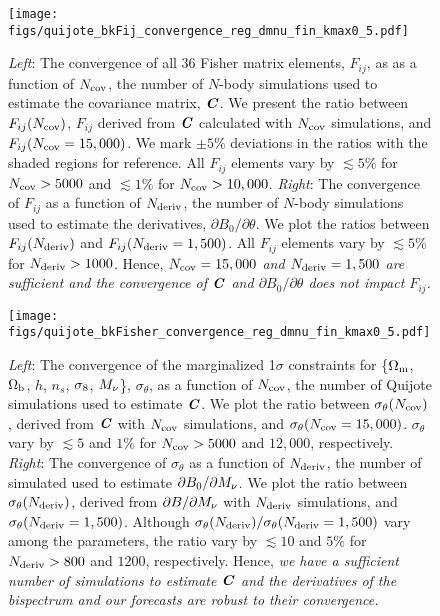 \begin{figure}
\begin{center}
    \texttt{[image: figs/quijote\_bkFij\_convergence\_reg\_dmnu\_fin\_kmax0\_5.pdf]}
    \caption{
        {\em Left}: The convergence of all 36 Fisher matrix elements, $F_{ij}$, as 
        as a function of $N_{\rm cov}$, the number of $N$-body simulations used to 
        estimate the covariance matrix, $\textbf{\textit{C}}$. We present the ratio between 
        $F_{ij}(N_{\rm cov})$, $F_{ij}$ derived from $\textbf{\textit{C}}$ calculated with 
        $N_{\rm cov}$ simulations, and $F_{ij}(N_{\rm cov} = 15,000)$. We mark 
        $\pm5\%$ deviations in the ratios with the shaded regions for reference. 
        All $F_{ij}$ elements vary by $\lesssim 5\%$ for $N_{\rm cov} > 5000$ and 
        $\lesssim 1\%$ for $N_{\rm cov} > 10,000$.
        {\em Right}: The convergence of $F_{ij}$ as a function of $N_{\rm deriv}$, 
        the number of $N$-body simulations used to estimate the derivatives, 
        $\partial B_0/\partial \theta$. We plot the ratios between $F_{ij}(N_{\rm deriv})$ 
        and $F_{ij}(N_{\rm deriv} = 1,500)$. All $F_{ij}$ elements vary by 
        $\lesssim 5\%$ for $N_{\rm deriv} > 1000$. Hence, {\em $N_{\rm cov} = 15,000$ 
        and $N_{\rm deriv} = 1,500$ are sufficient and the convergence of $\textbf{\textit{C}}$ 
        and $\partial B_0/\partial \theta$ does not impact $F_{ij}$.}
    }
\label{fig:fij_converge}
\end{center}
\end{figure}

\begin{figure}
\begin{center}
    \texttt{[image: figs/quijote\_bkFisher\_convergence\_reg\_dmnu\_fin\_kmax0\_5.pdf]} 
    \caption{{\em Left}: The convergence of the marginalized 1$\sigma$ constraints
    for \{$\Omega_{\rm m}$, $\Omega_{\rm b}$, $h$, $n_s$, $\sigma_8$, $M_\nu$\}, $\sigma_\theta$, as a function of 
    $N_{\rm cov}$, the number of Quijote simulations used to estimate $\textbf{\textit{C}}$. We 
    plot the ratio between $\sigma_\theta(N_{\rm cov})$, derived from $\textbf{\textit{C}}$ with 
    $N_{\rm cov}$ simulations, and $\sigma_\theta(N_{\rm cov} = 15,000)$. $\sigma_\theta$ vary by $\lesssim 5$ and $1\%$ for 
    $N_{\rm cov} > 5000$ and $12,000$, respectively. 
    {\em Right}: The convergence of $\sigma_\theta$ as a function of $N_{\rm deriv}$, 
    the number of simulated used to estimate $\partial B_0/\partial M_\nu$. We plot 
    the ratio between $\sigma_\theta(N_{\rm deriv})$, derived from $\partial B/\partial M_\nu$
    with $N_{\rm deriv}$ simulations, and $\sigma_\theta(N_{\rm deriv} = 1,500)$. Although 
    $\sigma_\theta(N_{\rm deriv})/\sigma_\theta(N_{\rm deriv} = 1,500)$ vary among 
    the parameters, the ratio vary by $\lesssim 10$ and $5\%$ for $N_{\rm deriv} > 800$ 
    and $1200$, respectively. Hence, {\em we have a sufficient number of simulations 
    to estimate $\textbf{\textit{C}}$ and the derivatives of the bispectrum and our forecasts are 
    robust to their convergence.} 
    }
\label{fig:converge}
\end{center}
\end{figure}

